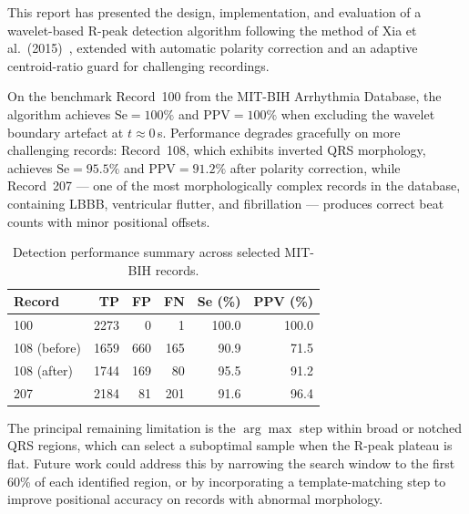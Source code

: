 \documentclass[11pt]{article}
\begin{document}
This report has presented the design, implementation, and evaluation of a wavelet-based R-peak detection algorithm following the method of Xia et al.\ (2015)~\cite{xia_quick_2015}, extended with automatic polarity correction and an adaptive centroid-ratio guard for challenging recordings.

On the benchmark Record~100 from the MIT-BIH Arrhythmia Database, the algorithm achieves $\text{Se} = 100\%$ and $\text{PPV} = 100\%$ when excluding the wavelet boundary artefact at $t \approx 0$\,s. Performance degrades gracefully on more challenging records: Record~108, which exhibits inverted QRS morphology, achieves $\text{Se} = 95.5\%$ and $\text{PPV} = 91.2\%$ after polarity correction, while Record~207 — one of the most morphologically complex records in the database, containing LBBB, ventricular flutter, and fibrillation — produces correct beat counts with minor positional offsets.

\begin{table}[htbp]
\centering
\begin{tabular}{lrrrrr}
\toprule
\textbf{Record} & \textbf{TP} & \textbf{FP} & \textbf{FN} & 
\textbf{Se (\%)} & \textbf{PPV (\%)} \\
\midrule
100 & 2273 & 0 & 1 & 100.0 & 100.0 \\
108 (before) & 1659 & 660 & 165 & 90.9 & 71.5 \\
108 (after)  & 1744 & 169 & 80  & 95.5 & 91.2 \\
207 & 2184 & 81 & 201 & 91.6 & 96.4 \\
\bottomrule
\end{tabular}
\caption{Detection performance summary across selected MIT-BIH records.}
\label{tab:summary}
\end{table}

The principal remaining limitation is the $\arg\max$ step within broad or notched QRS regions, which can select a suboptimal sample when the R-peak plateau is flat. Future work could address this by narrowing the search window to the first 60\% of each identified region, or by incorporating a template-matching step to improve positional accuracy on records with abnormal morphology.


\newpage



\end{document}

